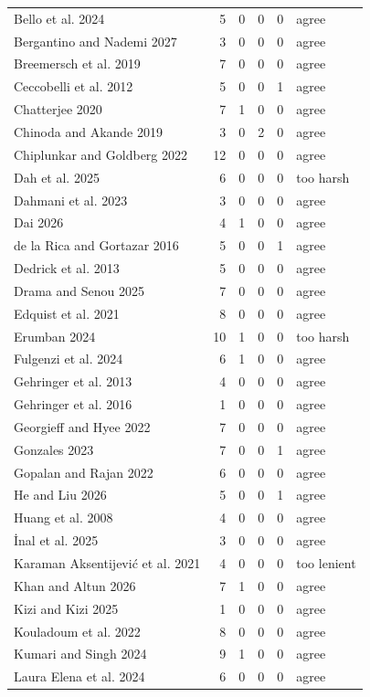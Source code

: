 {\begin{longtable}{@{}p{4cm} r r r r l@{}}
Bello et al. 2024 & 5 & 0 & 0 & 0 & agree \\
Bergantino and Nademi 2027 & 3 & 0 & 0 & 0 & agree \\
Breemersch et al. 2019 & 7 & 0 & 0 & 0 & agree \\
Ceccobelli et al. 2012 & 5 & 0 & 0 & 1 & agree \\
Chatterjee 2020 & 7 & 1 & 0 & 0 & agree \\
Chinoda and Akande 2019 & 3 & 0 & 2 & 0 & agree \\
Chiplunkar and Goldberg 2022 & 12 & 0 & 0 & 0 & agree \\
Dah et al. 2025 & 6 & 0 & 0 & 0 & too harsh \\
Dahmani et al. 2023 & 3 & 0 & 0 & 0 & agree \\
Dai 2026 & 4 & 1 & 0 & 0 & agree \\
de la Rica and Gortazar 2016 & 5 & 0 & 0 & 1 & agree \\
Dedrick et al. 2013 & 5 & 0 & 0 & 0 & agree \\
Drama and Senou 2025 & 7 & 0 & 0 & 0 & agree \\
Edquist et al. 2021 & 8 & 0 & 0 & 0 & agree \\
Erumban 2024 & 10 & 1 & 0 & 0 & too harsh \\
Fulgenzi et al. 2024 & 6 & 1 & 0 & 0 & agree \\
Gehringer et al. 2013 & 4 & 0 & 0 & 0 & agree \\
Gehringer et al. 2016 & 1 & 0 & 0 & 0 & agree \\
Georgieff and Hyee 2022 & 7 & 0 & 0 & 0 & agree \\
Gonzales 2023 & 7 & 0 & 0 & 1 & agree \\
Gopalan and Rajan 2022 & 6 & 0 & 0 & 0 & agree \\
He and Liu 2026 & 5 & 0 & 0 & 1 & agree \\
Huang et al. 2008 & 4 & 0 & 0 & 0 & agree \\
İnal et al. 2025 & 3 & 0 & 0 & 0 & agree \\
Karaman Aksentijević et al. 2021 & 4 & 0 & 0 & 0 & too lenient \\
Khan and Altun 2026 & 7 & 1 & 0 & 0 & agree \\
Kizi and Kizi 2025 & 1 & 0 & 0 & 0 & agree \\
Kouladoum et al. 2022 & 8 & 0 & 0 & 0 & agree \\
Kumari and Singh 2024 & 9 & 1 & 0 & 0 & agree \\
Laura Elena et al. 2024 & 6 & 0 & 0 & 0 & agree \\

\end{longtable}}

